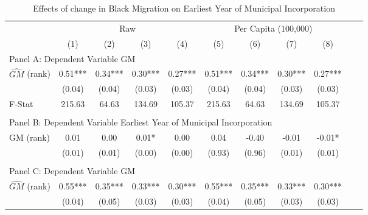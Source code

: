  \begin{table}[htbp]\centering {} \begin{threeparttable} \caption{Effects of change in Black Migration on Earliest Year of Municipal Incorporation} \begin{tabular}{l*{10}{c}} \toprule
                &\multicolumn{4}{c}{Raw}                                    &\multicolumn{4}{c}{Per Capita (100,000)}                   \\\cmidrule(lr){2-5}\cmidrule(lr){6-9}
                &\multicolumn{1}{c}{(1)}   &\multicolumn{1}{c}{(2)}   &\multicolumn{1}{c}{(3)}   &\multicolumn{1}{c}{(4)}   &\multicolumn{1}{c}{(5)}   &\multicolumn{1}{c}{(6)}   &\multicolumn{1}{c}{(7)}   &\multicolumn{1}{c}{(8)}   \\
\cmidrule(lr){1-9}
\multicolumn{8}{l}{Panel A: Dependent Variable GM}\\
\cmidrule(lr){1-9}
$\hat{GM}$ (rank)&       0.51***&       0.34***&       0.30***&       0.27***&       0.51***&       0.34***&       0.30***&       0.27***\\
                &     (0.04)   &     (0.04)   &     (0.03)   &     (0.03)   &     (0.04)   &     (0.04)   &     (0.03)   &     (0.03)   \\
\midrule
F-Stat          &     215.63   &      64.63   &     134.69   &     105.37   &     215.63   &      64.63   &     134.69   &     105.37   \\
\cmidrule[\heavyrulewidth](lr){1-9} \\ \cmidrule[\heavyrulewidth](lr){1-9}
\multicolumn{8}{l}{Panel B: Dependent Variable Earliest Year of Municipal Incorporation}\\
\cmidrule(lr){1-9}
GM  (rank)      &       0.01   &       0.00   &       0.01*  &       0.00   &       0.04   &      -0.40   &      -0.01   &      -0.01*  \\
                &     (0.01)   &     (0.01)   &     (0.00)   &     (0.00)   &     (0.93)   &     (0.96)   &     (0.01)   &     (0.01)   \\
\cmidrule[\heavyrulewidth](lr){1-9} \\ \cmidrule[\heavyrulewidth](lr){1-9}
\multicolumn{8}{l}{Panel C: Dependent Variable GM}\\
\cmidrule(lr){1-9}
$\hat{GM}$ (rank)&       0.55***&       0.35***&       0.33***&       0.30***&       0.55***&       0.35***&       0.33***&       0.30***\\
                &     (0.04)   &     (0.05)   &     (0.03)   &     (0.03)   &     (0.04)   &     (0.05)   &     (0.03)   &     (0.03)   \\

\end{tabular}
\end{threeparttable}
\end{table}
